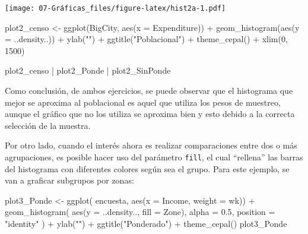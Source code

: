 \documentclass[
  12pt,
]{book}
\newenvironment{Shaded}{\begin{snugshade}}{\end{snugshade}}
\newcommand{\AttributeTok}[1]{\textcolor[rgb]{0.77,0.63,0.00}{#1}}
\newcommand{\DecValTok}[1]{\textcolor[rgb]{0.00,0.00,0.81}{#1}}
\newcommand{\FloatTok}[1]{\textcolor[rgb]{0.00,0.00,0.81}{#1}}
\newcommand{\FunctionTok}[1]{\textcolor[rgb]{0.00,0.00,0.00}{#1}}
\newcommand{\NormalTok}[1]{#1}
\newcommand{\OtherTok}[1]{\textcolor[rgb]{0.56,0.35,0.01}{#1}}
\newcommand{\SpecialCharTok}[1]{\textcolor[rgb]{0.00,0.00,0.00}{#1}}
\newcommand{\StringTok}[1]{\textcolor[rgb]{0.31,0.60,0.02}{#1}}
\begin{document}
\texttt{[image: 07-Gráficas\_files/figure-latex/hist2a-1.pdf]}

\begin{Shaded}
\begin{Highlighting}[]
\NormalTok{plot2\_censo }\OtherTok{\textless{}{-}} \FunctionTok{ggplot}\NormalTok{(BigCity, }\FunctionTok{aes}\NormalTok{(}\AttributeTok{x =}\NormalTok{ Expenditure)) }\SpecialCharTok{+}
  \FunctionTok{geom\_histogram}\NormalTok{(}\FunctionTok{aes}\NormalTok{(}\AttributeTok{y =}\NormalTok{ ..density..)) }\SpecialCharTok{+}
  \FunctionTok{ylab}\NormalTok{(}\StringTok{""}\NormalTok{) }\SpecialCharTok{+}
  \FunctionTok{ggtitle}\NormalTok{(}\StringTok{"Poblacional"}\NormalTok{) }\SpecialCharTok{+}
  \FunctionTok{theme\_cepal}\NormalTok{() }\SpecialCharTok{+}
  \FunctionTok{xlim}\NormalTok{(}\DecValTok{0}\NormalTok{, }\DecValTok{1500}\NormalTok{)}

\NormalTok{plot2\_censo }\SpecialCharTok{|}\NormalTok{ plot2\_Ponde }\SpecialCharTok{|}\NormalTok{ plot2\_SinPonde}
\end{Highlighting}
\end{Shaded}

Como conclusión, de ambos ejercicios, se puede observar que el histograma que mejor se aproxima al poblacional es aquel que utiliza los pesos de muestreo, aunque el gráfico que no los utiliza se aproxima bien y esto debido a la correcta selección de la muestra.

Por otro lado, cuando el interés ahora es realizar comparaciones entre dos o más agrupaciones, es posible hacer uso del parámetro \texttt{fill}, el cual ``rellena'' las barras del histograma con diferentes colores según sea el grupo. Para este ejemplo, se van a graficar subgrupos por zonas:

\begin{Shaded}
\begin{Highlighting}[]
\NormalTok{plot3\_Ponde }\OtherTok{\textless{}{-}} \FunctionTok{ggplot}\NormalTok{(}
\NormalTok{  encuesta,}
  \FunctionTok{aes}\NormalTok{(}\AttributeTok{x =}\NormalTok{ Income, }\AttributeTok{weight =}\NormalTok{ wk)) }\SpecialCharTok{+}
  \FunctionTok{geom\_histogram}\NormalTok{(}
    \FunctionTok{aes}\NormalTok{(}\AttributeTok{y =}\NormalTok{ ..density.., }\AttributeTok{fill =}\NormalTok{ Zone),}
    \AttributeTok{alpha =} \FloatTok{0.5}\NormalTok{,}
     \AttributeTok{position =} \StringTok{"identity"} 
\NormalTok{  ) }\SpecialCharTok{+}
  \FunctionTok{ylab}\NormalTok{(}\StringTok{""}\NormalTok{) }\SpecialCharTok{+}
  \FunctionTok{ggtitle}\NormalTok{(}\StringTok{"Ponderado"}\NormalTok{) }\SpecialCharTok{+}
  \FunctionTok{theme\_cepal}\NormalTok{()}
\NormalTok{plot3\_Ponde}
\end{Highlighting}
\end{Shaded}
\end{document}
